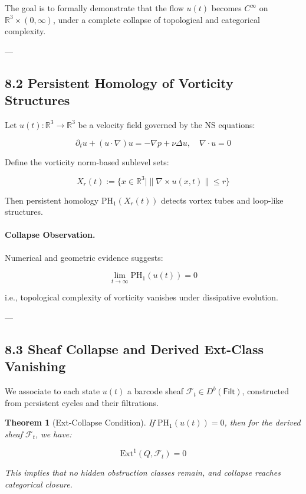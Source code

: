 \documentclass[11pt]{article}
\newtheorem{theorem}{Theorem}[section]
\begin{document}
The goal is to formally demonstrate that the flow \( u(t) \) becomes \( C^\infty \) on \( \mathbb{R}^3 \times (0,\infty) \),  
under a complete collapse of topological and categorical complexity.

---

\subsection*{8.2 Persistent Homology of Vorticity Structures}

Let \( u(t): \mathbb{R}^3 \to \mathbb{R}^3 \) be a velocity field governed by the NS equations:

\[
\partial_t u + (u \cdot \nabla)u = -\nabla p + \nu \Delta u, \quad \nabla \cdot u = 0
\]

Define the vorticity norm-based sublevel sets:

\[
X_r(t) := \{ x \in \mathbb{R}^3 \mid \| \nabla \times u(x,t) \| \leq r \}
\]

Then persistent homology \( \mathrm{PH}_1(X_r(t)) \) detects vortex tubes and loop-like structures.

\paragraph{Collapse Observation.}
Numerical and geometric evidence suggests:

\[
\lim_{t \to \infty} \mathrm{PH}_1(u(t)) = 0
\]

i.e., topological complexity of vorticity vanishes under dissipative evolution.

---

\subsection*{8.3 Sheaf Collapse and Derived Ext-Class Vanishing}

We associate to each state \( u(t) \) a barcode sheaf \( \mathcal{F}_t \in D^b(\mathsf{Filt}) \),  
constructed from persistent cycles and their filtrations.  

\begin{theorem}[Ext-Collapse Condition]
If \( \mathrm{PH}_1(u(t)) = 0 \), then for the derived sheaf \( \mathcal{F}_t \), we have:

\[
\mathrm{Ext}^1(Q, \mathcal{F}_t) = 0
\]

This implies that no hidden obstruction classes remain, and collapse reaches categorical closure.
\end{theorem}
\end{document}
